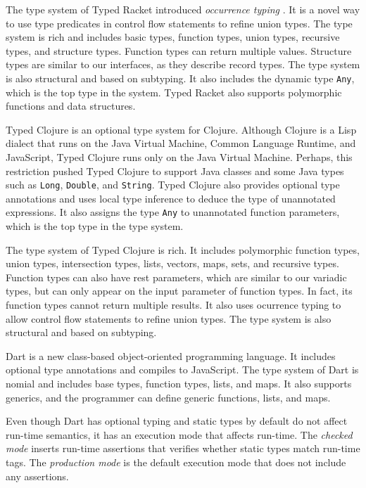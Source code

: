 The type system of Typed Racket introduced \emph{occurrence typing}
\citep{tobin-hochstadt2010ltu}.
It is a novel way to use type predicates in control flow statements
to refine union types.
The type system is rich and includes basic types, function types,
union types, recursive types, and structure types.
Function types can return multiple values.
Structure types are similar to our interfaces, as they describe
record types.
The type system is also structural and based on subtyping.
It also includes the dynamic type \texttt{Any}, which is the top
type in the system.
Typed Racket also supports polymorphic functions and data structures.

Typed Clojure \citep{bonnaire-sergeant2012typed-clojure} is an
optional type system for Clojure.
Although Clojure is a Lisp dialect that runs on the Java Virtual Machine,
Common Language Runtime, and JavaScript, Typed Clojure runs only on
the Java Virtual Machine.
Perhaps, this restriction pushed Typed Clojure to support Java classes
and some Java types such as \texttt{Long}, \texttt{Double}, and \texttt{String}.
Typed Clojure also provides optional type annotations and uses
local type inference to deduce the type of unannotated expressions.
It also assigns the type \texttt{Any} to unannotated function parameters,
which is the top type in the type system.

The type system of Typed Clojure is rich.
It includes polymorphic function types, union types, intersection types,
lists, vectors, maps, sets, and recursive types.
Function types can also have rest parameters, which are similar
to our variadic types, but can only appear on the input parameter
of function types.
In fact, its function types cannot return multiple results.
It also uses ocurrence typing to allow control flow statements to
refine union types.
The type system is also structural and based on subtyping.

Dart \citep{dart} is a new class-based object-oriented programming
language.
It includes optional type annotations and compiles to JavaScript.
The type system of Dart is nomial and includes base types,
function types, lists, and maps.
It also supports generics, and the programmer can define
generic functions, lists, and maps.

Even though Dart has optional typing and static types by
default do not affect run-time semantics, it has an
execution mode that affects run-time.
The \emph{checked mode} inserts run-time assertions that
verifies whether static types match run-time tags.
The \emph{production mode} is the default execution mode
that does not include any assertions.

